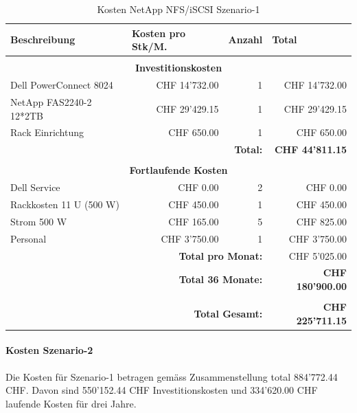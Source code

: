 \begin{table}[htbp]
\caption{Kosten NetApp NFS/iSCSI Szenario-1}
\begin{small}
\begin{tabular}{|l|r|r|r|}
\hline
\textbf{Beschreibung} & \multicolumn{1}{l|}{\textbf{Kosten pro Stk/M.}} & \multicolumn{1}{l|}{\textbf{Anzahl}} & \multicolumn{1}{l|}{\textbf{Total}} \\ \hline
 \multicolumn{ 4}{c}{} \\ \hline
\multicolumn{ 4}{|c|}{\textbf{Investitionskosten}} \\ \hline
Dell PowerConnect 8024 & CHF 14'732.00 & 1 & CHF 14'732.00 \\ \hline
NetApp FAS2240-2 12*2TB & CHF 29'429.15 & 1 & CHF 29'429.15 \\ \hline
Rack Einrichtung & CHF 650.00 & 1 & CHF 650.00 \\ \hline \hline
 \multicolumn{ 3}{r|}{\textbf{Total:}} & \textbf{CHF 44'811.15} \\ 
 \cline{4-4}
\multicolumn{ 4}{c}{} \\ \hline
\multicolumn{ 4}{|c|}{\textbf{Fortlaufende Kosten}} \\ \hline
Dell Service & CHF 0.00 & 2 & CHF 0.00 \\ \hline
Rackkosten 11 U (500 W) & CHF 450.00 & 1 & CHF 450.00 \\ \hline
Strom 500 W & CHF 165.00 & 5 & CHF 825.00 \\ \hline
Personal & CHF 3'750.00 & 1 & CHF 3'750.00 \\ \hline \hline
 \multicolumn{ 3}{r|}{\textbf{Total pro Monat:}} & CHF 5'025.00 \\
\cline{4-4}
 \multicolumn{ 3}{r|}{\textbf{Total 36 Monate:}} & \textbf{CHF 180'900.00} \\ \cline{4-4}
 \multicolumn{ 4}{c}{} \\ \cline{4-4}
 \multicolumn{ 3}{r|}{\textbf{Total Gesamt:}} & \textbf{CHF 225'711.15} \\ \cline{4-4}
\end{tabular}
\end{small}
\label{KostenNetAppS1}
\end{table}


\paragraph*{Kosten Szenario-2}
Die Kosten für Szenario-1 betragen gemäss Zusammenstellung total 884'772.44 CHF. Davon sind 550'152.44 CHF Investitionskosten und 334'620.00 CHF laufende Kosten für drei Jahre.

